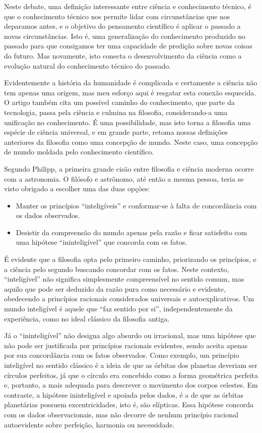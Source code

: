 Neste debate, uma definição interessante entre ciência e conhecimento técnico, é que o conhecimento técnico nos permite lidar com circunstâncias que nos deparamos antes, e o objetivo do pensamento científico é aplicar o passado a novas circunstâncias. Isto é, uma generalização do conhecimento produzido no passado para que consigamos ter uma capacidade de predição  sobre novas coisas do futuro. Mas novamente, isto conecta o desenvolvimento da ciência como a evolução natural do conhecimento técnico do passado.

Evidentemente a história da humanidade é complicada e certamente a ciência não tem apenas uma origem, mas meu esforço aqui é resgatar esta conexão esquecida.  O artigo também cita um possível caminho do conhecimento, que parte da tecnologia, passa pela ciência e culmina na filosofia, considerando-a uma unificação no conhecimento. É uma possibilidade, mas isto torna a filosofia uma espécie de ciência universal, e em grande parte, retoma nossas definições anteriores da filosofia como uma concepção de mundo. Neste caso, uma concepção de mundo moldada pelo conhecimento científico.

Segundo Philipp, a primeira grande cisão entre filosofia e ciência moderna ocorre com a astronomia. O filósofo e astrônomo, até então a mesma pessoa, teria se visto obrigado a escolher uma das duas opções:

\begin{itemize}
    \item Manter os princípios “inteligíveis” e conformar-se à falta de concordância com os dados observados.
    \item Desistir da compreensão do mundo apenas pela razão e ficar satisfeito com uma hipótese “ininteligível” que concorda com os fatos.
\end{itemize}
É evidente que a filosofia opta pelo primeiro caminho, priorizando os princípios, e a ciência pelo segundo buscando concordar com os fatos.  Neste contexto, “inteligível” não significa simplesmente compreensível no sentido comum, mas aquilo que pode ser deduzido da razão pura como necessário e evidente, obedecendo a princípios racionais considerados universais e autoexplicativos. Um mundo inteligível é aquele que “faz sentido por si”, independentemente da experiência, como no ideal clássico da filosofia antiga. 

Já o “ininteligível” não designa algo absurdo ou irracional, mas uma hipótese que não pode ser justificada por princípios racionais evidentes, sendo aceita apenas por sua concordância com os fatos observados.  Como exemplo, um princípio inteligível no sentido clássico é a ideia de que as órbitas dos planetas deveriam ser círculos perfeitos, já que o círculo era concebido como a forma geométrica perfeita e, portanto, a mais adequada para descrever o movimento dos corpos celestes. Em contraste, a hipótese ininteligível e apoiada pelos dados, é a de que as órbitas planetárias possuem excentricidades, isto é, são elípticas. Essa hipótese concorda com os dados observacionais, mas não decorre de nenhum princípio racional autoevidente sobre perfeição, harmonia ou necessidade.

